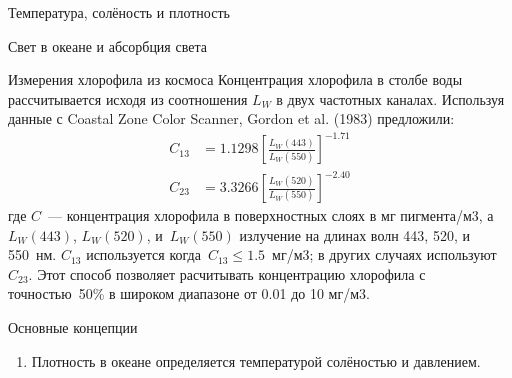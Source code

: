 \begin{chapter}{Температура, солёность и плотность}
\begin{section}{Свет в океане и абсорбция света}
\begin{paragraph}{Измерения хлорофила из космоса}
Концентрация хлорофила в столбе воды рассчитывается исходя
из соотношения $L_W$ в двух частотных каналах. Используя данные с
Coastal Zone Color Scanner, Gordon et al. (1983) предложили:
\begin{subequations}
\begin{align}
C_{13} &= 1.1298 \left[\frac{L_W(443)}{L_W(550)}\right]^{-1.71}\\
C_{23} &= 3.3266 \left[\frac{L_W(520)}{L_W(550)}\right]^{-2.40}
\end{align}
\end{subequations}
где $C$~--- концентрация хлорофила в поверхностных слоях в мг
пигмента/м3, а $L_W(443)$, $L_W(520)$, и~$L_W(550)$ излучение на
длинах волн 443, 520, и 550~нм. $C_{13}$ используется 
когда~$C_{13}\le 1.5$~мг/м3; в других случаях используют~$C_{23}$.  
Этот способ позволяет расчитывать концентрацию хлорофила с точностью~50\% 
в широком диапазоне от 0.01 до 10 мг/м3.
%
%
\end{paragraph}
\end{section}

\begin{section}{Основные концепции}
\begin{enumerate}
\item
Плотность в океане определяется температурой солёностью и давлением.
%
   

\end{enumerate}
\end{section}
\end{chapter}
